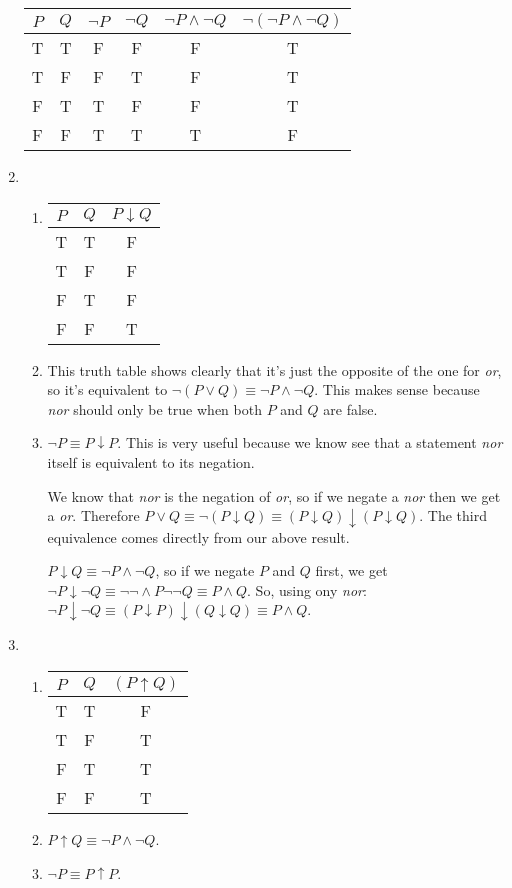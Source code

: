\documentclass{article}
\begin{document}
\begin{enumerate}
  \begin{tabular}{c c c c c c}
    $P$ & $Q$ & $\lnot P$ & $\lnot Q$ & $\lnot P \land \lnot Q$ & $\lnot (\lnot P \land \lnot Q)$ \\ \hline
    T & T & F & F & F & T \\
    T & F & F & T & F & T \\
    F & T & T & F & F & T \\
    F & F & T & T & T & F \\
  \end{tabular}
\item
  \begin{enumerate}
  \item
    \begin{tabular}{c c c}
      $P$ & $Q$ & $P \downarrow Q$ \\ \hline
      T & T & F \\
      T & F & F \\
      F & T & F \\
      F & F & T \\
      \end{tabular}
      \item
	This truth table shows clearly that it's just the opposite of the one for \textit{or}, so it's equivalent to $\lnot (P \lor Q) \equiv \lnot P \land \lnot Q$.  This makes sense because \textit{nor} should only be true when both $P$ and $Q$ are false.
      \item
	$\lnot P \equiv P \downarrow P$.  This is very useful because we know see that a statement \textit{nor} itself is equivalent to its negation.

	We know that \textit{nor} is the negation of \textit{or}, so if we negate a \textit{nor} then we get a \textit{or}.  Therefore $P \lor Q \equiv \lnot (P \downarrow Q) \equiv (P \downarrow Q) \downarrow (P \downarrow Q)$.  The third equivalence comes directly from our above result.

	$P \downarrow Q \equiv \lnot P \land \lnot Q$, so if we negate $P$ and $Q$ first, we get $\lnot P \downarrow \lnot Q \equiv \lnot \lnot \land P \lnot \lnot Q \equiv P \land Q$.  So, using ony \textit{nor}: $\lnot P \downarrow \lnot Q \equiv (P \downarrow P) \downarrow (Q \downarrow Q) \equiv P \land Q$.
  \end{enumerate}
\item
  \begin{enumerate}
  \item
    \begin{tabular}{c c c}
    $P$ & $Q$ & $(P \uparrow Q)$ \\ \hline
    T & T & F \\
    T & F & T \\
    F & T & T \\
    F & F & T \\
    \end{tabular}
  \item
    $P \uparrow Q \equiv \lnot P \land \lnot Q$.
  \item
    $\lnot P \equiv P \uparrow P$.


\end{enumerate}
\end{enumerate}
\end{document}
